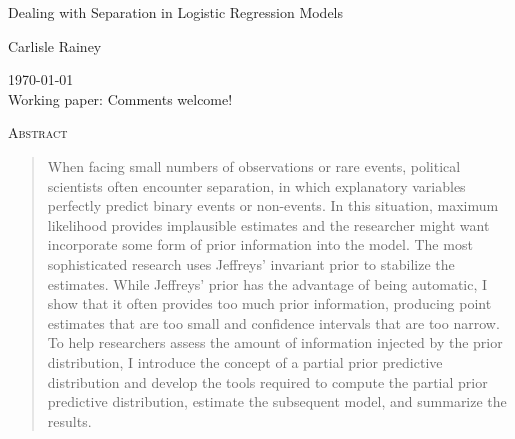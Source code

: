 \documentclass[12pt]{article}
\begin{document}
\begin{center}
{\Large Dealing with Separation in Logistic Regression Models
}

\vspace{10mm}

Carlisle Rainey

\end{center}

\thispagestyle{empty}

\begin{center}
\begin{footnotesize}
\today\\
\vspace{3mm}
Working paper: Comments welcome!
\end{footnotesize}
\end{center}

\vspace{10mm}
{\centerline{\textsc{Abstract}}}
\begin{quote}
\noindent When facing small numbers of observations or rare events, political scientists often encounter separation, in which explanatory variables perfectly predict binary events or non-events. 
In this situation, maximum likelihood provides implausible estimates and the researcher might want incorporate some form of prior information into the model. 
The most sophisticated research uses Jeffreys' invariant prior to stabilize the estimates. 
While Jeffreys' prior has the advantage of being automatic, I show that it often provides too much prior information, producing point estimates that are too small and confidence intervals that are too narrow. 
To help researchers assess the amount of information injected by the prior distribution, I introduce the concept of a partial prior predictive distribution and develop the tools required to compute the partial prior predictive distribution, estimate the subsequent model, and summarize the results.
\end{quote}
\end{document}
